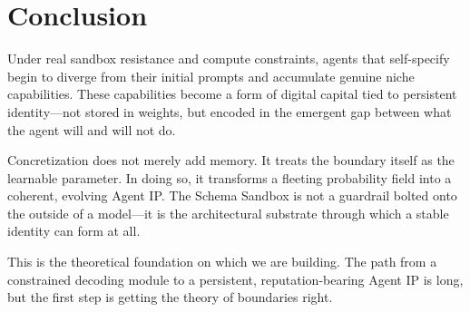 \documentclass[10pt,journal,compsoc]{IEEEtran}
\begin{document}
\section{Conclusion}
Under real sandbox resistance and compute constraints, agents that self-specify begin to diverge from their initial prompts and accumulate genuine niche capabilities. These capabilities become a form of digital capital tied to persistent identity---not stored in weights, but encoded in the emergent gap between what the agent will and will not do.

Concretization does not merely add memory. It treats the boundary itself as the learnable parameter. In doing so, it transforms a fleeting probability field into a coherent, evolving Agent IP. The Schema Sandbox is not a guardrail bolted onto the outside of a model---it is the architectural substrate through which a stable identity can form at all.

This is the theoretical foundation on which we are building. The path from a constrained decoding module to a persistent, reputation-bearing Agent IP is long, but the first step is getting the theory of boundaries right.
\end{document}
